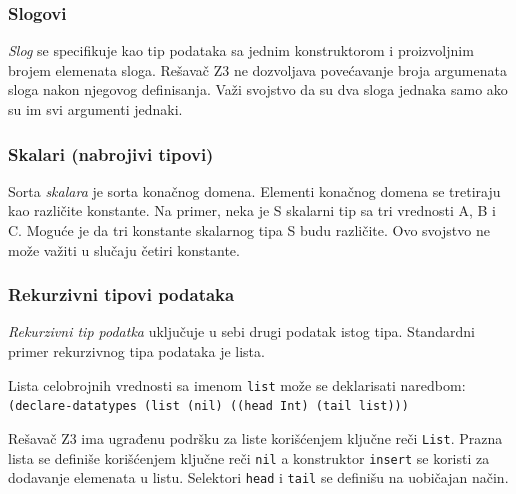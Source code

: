 \documentclass[12pt,oneside]{memoir}
\begin{document}
\subsubsection{Slogovi}
\emph{Slog} se specifikuje kao tip podataka sa jednim konstruktorom i proizvoljnim brojem elemenata sloga. Rešavač Z3 ne dozvoljava povećavanje broja argumenata sloga nakon njegovog definisanja. Važi svojstvo da su dva sloga jednaka samo ako su im svi argumenti jednaki.
\subsubsection{Skalari (nabrojivi tipovi)}

Sorta \emph{skalara} je sorta konačnog domena. Elementi konačnog domena se tretiraju kao različite konstante. Na primer, neka je S skalarni tip sa tri vrednosti A, B i C. Moguće je da tri konstante skalarnog tipa S budu različite. Ovo svojstvo ne može važiti u slučaju četiri konstante.


\subsubsection{Rekurzivni tipovi podataka}
\emph{Rekurzivni tip podatka} uključuje u sebi drugi podatak istog tipa. Standardni primer rekurzivnog tipa podataka je lista.

Lista celobrojnih vrednosti sa imenom \texttt{list} može se deklarisati naredbom:\\
\texttt{(declare-datatypes (list (nil) ((head Int) (tail list)))}
\par
Rešavač Z3 ima ugrađenu podršku za liste korišćenjem ključne reči \texttt{List}.
Prazna lista se definiše korišćenjem ključne reči \texttt{nil} a konstruktor \texttt{insert} se koristi za dodavanje elemenata u listu. Selektori \texttt{head} i \texttt{tail} se definišu na uobičajan način.
\end{document}
